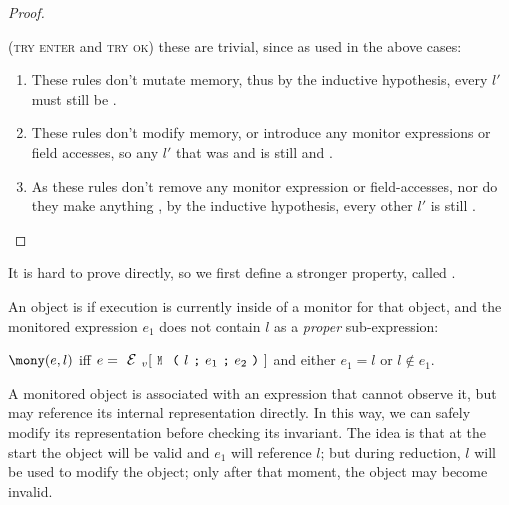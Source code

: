 \begin{proof}
\begin{ienumerate}
\item (\textsc{try enter} and \textsc{try ok}) these are trivial, since as used in the above cases:
\begin{enumerate}
	\item These rules don't mutate memory, thus by the inductive hypothesis, every $l'$ must still be \CNC.
	\item These rules don't modify memory, or introduce any monitor expressions or field accesses, so any $l'$ that was \WE and \NCM is still \WE and \NCM.
	\item As these rules don't remove any monitor expression or field-accesses, nor do they make anything \reach, by the inductive hypothesis, every other $l'$ is still \HNO.
\end{enumerate}

\end{ienumerate}
\end{proof}

It is hard to prove  directly,
so we first define a stronger property,
called .

An object is \mony if execution
is currently inside of a monitor for that object, and
the monitored expression $e_1$ does not
contain $l$ as a \emph{proper} sub-expression:

\indent $\mony(e,l)$ iff
$e=\EV[\M{l}{e_1}{e_2}]$ and either $e_1=l$ or $l \notin e_1$.%

\noindent A monitored object is associated with an expression that cannot observe it, but may
reference its internal representation directly.
In this way, we can safely modify its representation before checking its invariant.
The idea is that at the start the object will be valid and $e_1$ will reference $l$;
but during reduction, $l$ will be used to
modify the object; only after that moment, the object may become invalid.

